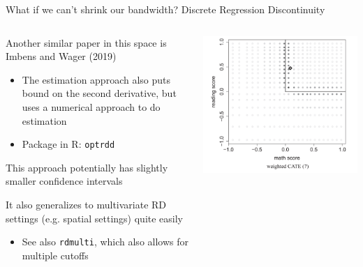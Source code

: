 \documentclass[notes,11pt, aspectratio=169]{beamer}
\newenvironment{wideitemize}{\itemize\addtolength{\itemsep}{10pt}}{\enditemize}
\begin{document}
\begin{frame}{What if we can't shrink our bandwidth? Discrete Regression Discontinuity}
    \begin{columns}[onlytextwidth, T] %
      \begin{column}{.6\textwidth}
        \begin{wideitemize}
        \item Another similar paper in this space is Imbens and Wager
          (2019)
          \begin{itemize}
          \item The estimation approach also puts bound on the second
            derivative, but uses a numerical approach to do estimation
          \item Package in R: \texttt{optrdd}
          \end{itemize}
        \item This approach potentially has slightly smaller confidence intervals
        \item It also generalizes to multivariate RD settings
          (e.g. spatial settings) quite easily
          \begin{itemize}
          \item See also \texttt{rdmulti}, which also allows for multiple cutoffs
          \end{itemize}
        \end{wideitemize}
      \end{column}%
      \hfill%
      \begin{column}{.4\textwidth}
        \includegraphics[width=\linewidth]{images/rd_imbenswager.png}
      \end{column}%
    \end{columns}
\end{frame}
\end{document}
